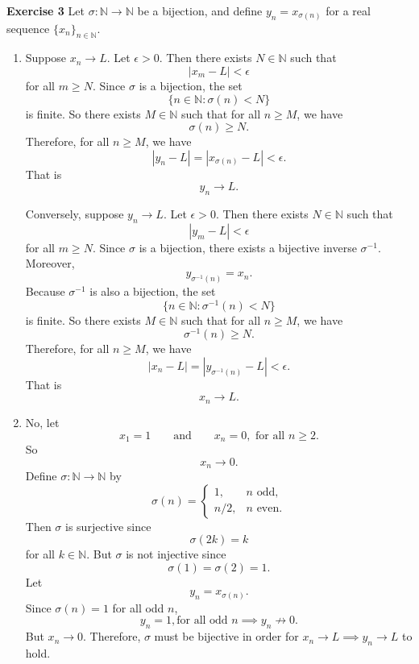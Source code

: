 \documentclass[12pt]{article}
\begin{document}
\noindent{} \textbf{Exercise 3}
Let $\sigma: \mathbb{N} \to \mathbb{N}$ be a bijection, and define $y_n = x_{\sigma(n)}$ for a real sequence $\{x_n\}_{n \in \mathbb{N}}$.
\begin{enumerate}
    \item [(a)]
          Suppose $x_n \to L$. Let $\epsilon > 0$.
          Then there exists $N \in \mathbb{N}$ such that
          \[
              |x_m - L| < \epsilon
          \]
          for all $m \geq N$.
          Since $\sigma$ is a bijection, the set
          \[
              \{n \in \mathbb{N} : \sigma(n) < N\}
          \]
          is finite.
          So there exists $M \in \mathbb{N}$ such that for all $n \geq M$, we have
          \[
              \sigma(n) \geq N.
          \]
          Therefore, for all $n \geq M$, we have
          \[
              |y_n - L| = |x_{\sigma(n)} - L| < \epsilon.
          \]
          That is
          \[
              y_n \to L.
          \]

          Conversely, suppose $y_n \to L$. Let $\epsilon > 0$.
          Then there exists $N \in \mathbb{N}$ such that
          \[
              |y_m - L| < \epsilon
          \]
          for all $m \geq N$.
          Since $\sigma$ is a bijection, there exists a bijective inverse $\sigma^{-1}$.
          Moreover,
          \[
              y_{\sigma^{-1}(n)} = x_n.
          \]
          Because \(\sigma^{-1}\) is also a bijection, the set
          \[
              \{n\in\mathbb N:\sigma^{-1}(n)<N\}
          \]
          is finite.
          So there exists $M \in \mathbb{N}$ such that for all $n \geq M$, we have
          \[
              \sigma^{-1}(n) \geq N.
          \]
          Therefore, for all $n \geq M$, we have
          \[
              |x_n - L| = |y_{\sigma^{-1}(n)} - L| < \epsilon.
          \]
          That is
          \[
              x_n \to L.
          \]
    \item [(b)]
          No, let
          \[
              x_1 = 1 \qquad \text{and} \qquad x_n = 0, \text{ for all } n \geq 2.
          \]
          So
          \[
              x_n \to 0.
          \]
          Define $\sigma : \mathbb{N} \to \mathbb{N}$ by
          \[
              \sigma(n)=
              \begin{cases}
                  1,   & n \text{ odd},  \\
                  n/2, & n \text{ even}.
              \end{cases}
          \]
          Then $\sigma$ is surjective since
          \[
              \sigma(2k) = k
          \]
          for all $k \in \mathbb{N}$.
          But $\sigma$ is not injective since
          \[
              \sigma(1) = \sigma(2) = 1.
          \]
          Let
          \[
              y_n = x_{\sigma(n)}.
          \]
          Since $\sigma(n) = 1$ for all odd $n$,
          \[
              y_n = 1,  \text{for all odd } n \implies y_n \not \to 0.
          \]
          But $x_n \to 0$.
          Therefore, $\sigma$ must be bijective in order for $x_n \to L \implies y_n \to L$ to hold.

\end{enumerate}
\end{document}
